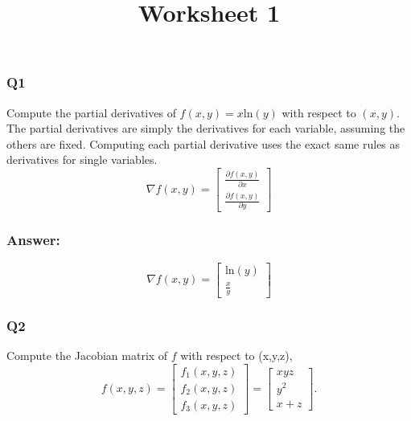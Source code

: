 \documentclass[a4paper, 10pt]{article}
\author{}
\date{}
\title{Worksheet 1 \vspace{-0.5cm}}
\begin{document}
\maketitle
\vspace{-2cm}

\subsubsection*{Q1}
Compute the partial derivatives  of $f(x,y) = x \text{ln}(y)$ with respect to $(x,y)$. The partial derivatives are simply the derivatives for each variable, assuming the others are fixed. Computing each partial derivative uses the exact same rules as derivatives for single variables.  
\[
\nabla f(x,y) =
\begin{bmatrix}
  \frac{\partial f(x,y)}{\partial x} \\
  \frac{\partial f(x,y)}{\partial y} 
\end{bmatrix}
\]

\subsubsection*{Answer:}
\begin{equation*}
  \nabla f(x, y) = \begin{bmatrix} \text{ln}(y) \\ \frac{x}{y} \end{bmatrix}
\end{equation*}

\subsubsection*{Q2}
Compute the Jacobian matrix of $f$ with respect to (x,y,z), 
\[
f(x,y,z) = 
\begin{bmatrix}
  f_{1}(x,y,z) \\
  f_{2}(x,y,z) \\
  f_{3}(x,y,z)
\end{bmatrix}
=
\begin{bmatrix}
  xyz \\
  y^2 \\
  x+z
\end{bmatrix}.
\]
\end{document}
